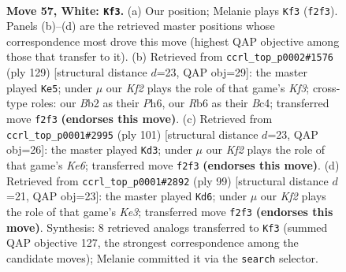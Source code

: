 \documentclass[11pt]{article}
\begin{document}
\clearpage

\begin{figure}[p]\centering
\begin{subfigure}{0.46\textwidth}\centering
\resizebox{\linewidth}{!}{%
\newchessgame
\chessboard[
  setfen={7k/8/1R6/pp4r1/b1p5/P1P5/1B3K2/8 w - - 20 57},
  showmover=false,
  pgfstyle=straightmove, color=movearrow, markmove={f2-f3}
]}
\caption{}
\end{subfigure}\hfill
\begin{subfigure}{0.46\textwidth}\centering
\resizebox{\linewidth}{!}{%
\newchessgame
\chessboard[
  setfen={1R6/8/2B2k1p/1P4p1/2b3P1/7P/1r6/6K1 b - - 0 65},
  showmover=false,
  pgfstyle=straightmove, color=movearrow, markmove={f6-e5}
]}
\caption{}
\end{subfigure}
\\[4pt]
\begin{subfigure}{0.46\textwidth}\centering
\resizebox{\linewidth}{!}{%
\newchessgame
\chessboard[
  setfen={8/8/5R2/7p/1B4bP/P1P1k1P1/r7/6K1 b - - 26 51},
  showmover=false,
  pgfstyle=straightmove, color=movearrow, markmove={e3-d3}
]}
\caption{}
\end{subfigure}\hfill
\begin{subfigure}{0.46\textwidth}\centering
\resizebox{\linewidth}{!}{%
\newchessgame
\chessboard[
  setfen={8/pB6/4k3/rP6/7p/6bP/1R2K1P1/8 b - - 2 50},
  showmover=false,
  pgfstyle=straightmove, color=movearrow, markmove={e6-d6}
]}
\caption{}
\end{subfigure}
\caption{\textbf{Move 57, White: \texttt{Kf3}.} (a) Our position; Melanie plays \texttt{Kf3} (\texttt{f2f3}). Panels (b)--(d) are the retrieved master positions whose correspondence most drove this move (highest QAP objective among those that transfer to it). (b) Retrieved from \texttt{ccrl\_top\_p0002\#1576} (ply 129) [structural distance $d$=23, QAP obj=29]: the master played \texttt{Ke5}; under $\mu$ our \emph{Kf2} plays the role of that game's \emph{Kf3}; cross-type roles: our \emph{B}b2 as their \emph{P}h6, our \emph{R}b6 as their \emph{B}c4; transferred move \texttt{f2f3} \textbf{(endorses this move)}. (c) Retrieved from \texttt{ccrl\_top\_p0001\#2995} (ply 101) [structural distance $d$=23, QAP obj=26]: the master played \texttt{Kd3}; under $\mu$ our \emph{Kf2} plays the role of that game's \emph{Ke6}; transferred move \texttt{f2f3} \textbf{(endorses this move)}. (d) Retrieved from \texttt{ccrl\_top\_p0001\#2892} (ply 99) [structural distance $d$=21, QAP obj=23]: the master played \texttt{Kd6}; under $\mu$ our \emph{Kf2} plays the role of that game's \emph{Ke3}; transferred move \texttt{f2f3} \textbf{(endorses this move)}. Synthesis: 8 retrieved analogs transferred to \texttt{Kf3} (summed QAP objective 127, the strongest correspondence among the candidate moves); Melanie committed it via the \texttt{search} selector.}
\label{fig:thought-m112}
\end{figure}
\end{document}
